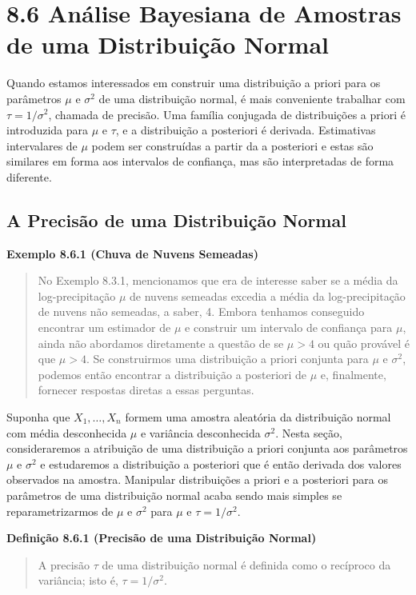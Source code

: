 \section*{8.6 Análise Bayesiana de Amostras de uma Distribuição Normal}

Quando estamos interessados em construir uma distribuição a priori para os parâmetros $\mu$ e $\sigma^2$ de uma distribuição normal, é mais conveniente trabalhar com $\tau = 1/\sigma^2$, chamada de precisão. Uma família conjugada de distribuições a priori é introduzida para $\mu$ e $\tau$, e a distribuição a posteriori é derivada. Estimativas intervalares de $\mu$ podem ser construídas a partir da a posteriori e estas são similares em forma aos intervalos de confiança, mas são interpretadas de forma diferente.

\subsection*{A Precisão de uma Distribuição Normal}

\vspace{1em}
\noindent\textbf{Exemplo 8.6.1 (Chuva de Nuvens Semeadas)}
\begin{quote}
    No Exemplo 8.3.1, mencionamos que era de interesse saber se a média da log-precipitação $\mu$ de nuvens semeadas excedia a média da log-precipitação de nuvens não semeadas, a saber, 4. Embora tenhamos conseguido encontrar um estimador de $\mu$ e construir um intervalo de confiança para $\mu$, ainda não abordamos diretamente a questão de se $\mu > 4$ ou quão provável é que $\mu > 4$. Se construirmos uma distribuição a priori conjunta para $\mu$ e $\sigma^2$, podemos então encontrar a distribuição a posteriori de $\mu$ e, finalmente, fornecer respostas diretas a essas perguntas.
\end{quote}
\vspace{1em}

Suponha que $X_1, \dots, X_n$ formem uma amostra aleatória da distribuição normal com média desconhecida $\mu$ e variância desconhecida $\sigma^2$. Nesta seção, consideraremos a atribuição de uma distribuição a priori conjunta aos parâmetros $\mu$ e $\sigma^2$ e estudaremos a distribuição a posteriori que é então derivada dos valores observados na amostra. Manipular distribuições a priori e a posteriori para os parâmetros de uma distribuição normal acaba sendo mais simples se reparametrizarmos de $\mu$ e $\sigma^2$ para $\mu$ e $\tau = 1/\sigma^2$.

\vspace{1em}
\noindent\textbf{Definição 8.6.1 (Precisão de uma Distribuição Normal)}
\begin{quote}
    A precisão $\tau$ de uma distribuição normal é definida como o recíproco da variância; isto é, $\tau = 1/\sigma^2$.
\end{quote}
\vspace{1em}

